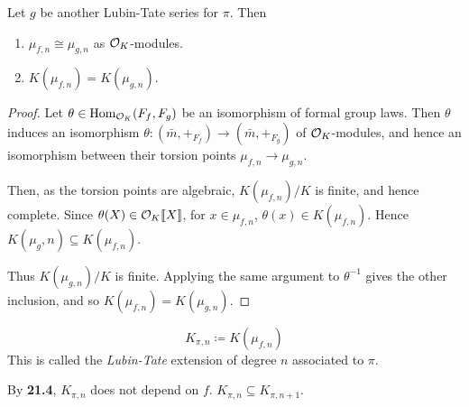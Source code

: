 \documentclass[10pt,a4paper]{article}
\begin{document}
\begin{proposition}
  Let $g$ be another Lubin-Tate series for $\pi$. Then
  \begin{enumerate}
    \item $\mu_{f,n} \cong \mu_{g, n}$ as $\mathcal{O}_K$-modules.
    \item $K(\mu_{f,n}) = K(\mu_{g,n})$.
  \end{enumerate}
\end{proposition}
\begin{proof}
  Let $\theta \in \operatorname{Hom}_{\mathcal{O}_K}(F_f, F_g)$ be an isomorphism of formal group laws. Then $\theta$ induces an isomorphism $\theta : (\bar{m}, +_{F_f}) \to (\bar{m}, +_{F_g})$ of $\mathcal{O}_K$-modules, and hence an isomorphism between their torsion points $\mu_{f,n} \to \mu_{g,n}$.

  Then, as the torsion points are algebraic, $K(\mu_{f,n})/K$ is finite, and hence complete. Since $\theta(X)\in \mathcal{O}_K\llbracket X \rrbracket$, for $x \in \mu_{f, n}$, $\theta(x) \in K(\mu_{f,n})$. Hence $K(\mu_g, n) \subseteq K(\mu_{f,n})$.

  Thus $K(\mu_{g,n})/K$ is finite. Applying the same argument to $\theta^{-1}$ gives the other inclusion, and so $K(\mu_{f,n}) = K(\mu_{g,n})$.
\end{proof}
\begin{definition}
  \[K_{\pi,n} \coloneqq K(\mu_{f,n})\]
  This is called the \emph{Lubin-Tate} extension of degree $n$ associated to $\pi$.
\end{definition}
By \textbf{21.4}, $K_{\pi,n}$ does not depend on $f$. $K_{\pi,n} \subseteq K_{\pi, n+1}$.
\end{document}
